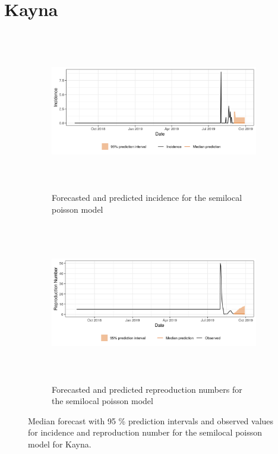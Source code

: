  \section{ Kayna }\begin{figure}[H]\begin{subfigure}{\textwidth}  \centering  \includegraphics[width=0.9\linewidth, height=7cm]{../output/Kayna_predictions.png}  \caption{Forecasted and predicted incidence for the semilocal poisson model}\end{subfigure}

\begin{subfigure}{\textwidth}  \centering  \includegraphics[width=0.9\linewidth, height=7cm]{../output/Kayna_Rs.png}  \caption{Forecasted and predicted repreoduction numbers for the semilocal poisson model}\end{subfigure}  \caption{Median forecast with 95 \% prediction intervals and observed values for incidence and reproduction number for the semilocal poisson model for Kayna.}\end{figure}

